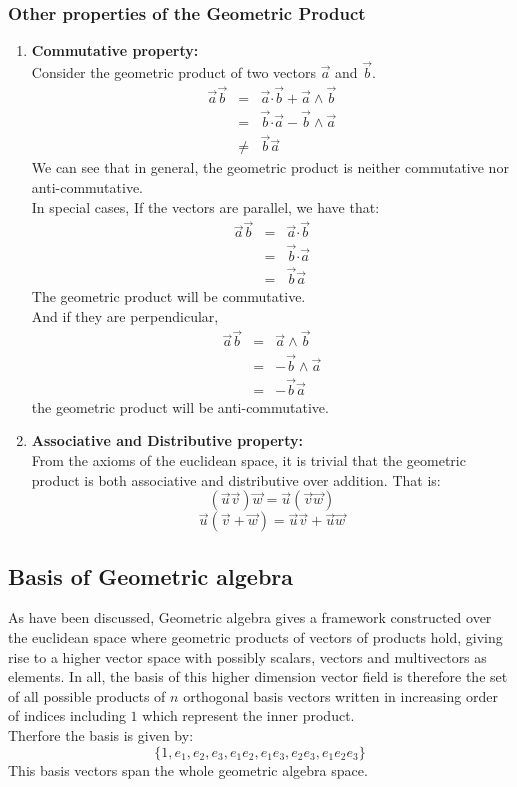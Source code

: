 \documentclass[12pt,onecolumn,letterpaper]{article} %
\begin{document}
\subsubsection{Other properties of the Geometric Product}
\begin{enumerate}
    \item \textbf{Commutative property:}\\
    Consider the geometric product of two vectors $\vec{a}$ and $\vec{b}$.
   \begin{eqnarray*}
    \vec{a}\vec{b}&=&\vec{a}\boldsymbol{\cdot} \vec{b}+\vec{a}\wedge\vec{b}\\
     &=&\vec{b} \boldsymbol{\cdot} \vec{a}-\vec{b}\wedge\vec{a}\\
   &\neq& \vec{b}\vec{a}
\end{eqnarray*}
We can see that in general, the geometric product is neither commutative nor anti-commutative. \\In special cases, If the vectors are parallel, we have that:
 \begin{eqnarray*}
    \vec{a}\vec{b}&=&\vec{a}\boldsymbol{\cdot} \vec{b}\\
     &=&\vec{b} \boldsymbol{\cdot} \vec{a}\\
   &=& \vec{b}\vec{a}
\end{eqnarray*}
 The geometric product will be commutative.\\
   And if they are perpendicular,
    \begin{eqnarray*}
    \vec{a}\vec{b}&=&\vec{a}\wedge\vec{b}\\
     &=&-\vec{b}\wedge\vec{a}\\
   &=& -\vec{b}\vec{a}
\end{eqnarray*}
the geometric product will be anti-commutative.
  \item \textbf{Associative and Distributive property:}\\ 
  From the axioms of the euclidean space, it is trivial that the geometric product is both associative and distributive over addition. That is:
  $$(\vec{u}\vec{v})\vec{w}=\vec{u}(\vec{v}\vec{w})$$
  $$\vec{u}(\vec{v}+\vec{w})=\vec{u}\vec{v}+\vec{u}\vec{w}$$
\end{enumerate}
\subsection{Basis of Geometric algebra}
As have been discussed, Geometric algebra gives a framework constructed over the euclidean space where geometric products of vectors of products hold, giving rise to a higher vector space with possibly scalars, vectors and multivectors as elements. In all, the basis of this higher dimension vector field is therefore the  set of all possible products of $n$ orthogonal basis vectors written in increasing order of indices including $1$ which represent the inner product. \\
Therfore the basis is given by:
\begin{equation}
    \{1,e_{1},e_{2},e_{3},e_{1}e_{2},e_{1}e_{3},e_{2}e_{3},e_{1}e_{2}e_{3}\}
\end{equation}
This basis vectors span the whole geometric algebra space.
\end{document}
